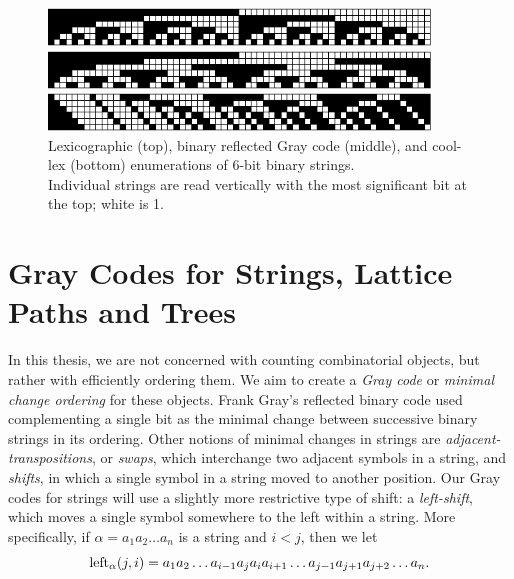 \begin{figure}
    \centering
\includegraphics[width=4in]{BLX6-cropped.pdf} 

\includegraphics[width=4in]{BRGC6-cropped.pdf} 

\includegraphics[width=4in]{BCLX6-cropped.pdf} 

    \caption{Lexicographic (top), binary reflected Gray code (middle), and cool-lex (bottom) enumerations of 6-bit binary strings. \\ 
    Individual strings are read vertically with the most significant bit at the top; white is 1.
    }
    \label{binary}
\end{figure}

\section{Gray Codes for Strings, Lattice Paths and Trees} \label{sec:intro_Graycodes}
In this thesis, we are not concerned with counting combinatorial objects, but rather with efficiently ordering them.  We aim to create a \emph{Gray code} or \emph{minimal change ordering} for these objects.  Frank Gray's reflected binary code used complementing a single bit as the minimal change between successive binary strings in its ordering.  Other notions of minimal changes in strings are \emph{adjacent-transpositions}, or \emph{swaps}, which interchange two adjacent symbols in a string, and \emph{shifts}, in which a single symbol in a string moved to another position. Our Gray codes for strings will use a slightly more restrictive type of shift: a \emph{left-shift}, which moves a single symbol somewhere to the left within a string. 
More specifically, if $\alpha = a_1 a_2 \ldots a_n$ is a string and $i < j$, then we let
\begin{equation}
    \lshiftindex[\alpha]{j}{i} = a_1 a_2 \ldots a_{i-1} a_j a_{i} a_{i+1} \ldots a_{j-1} a_{j+1} a_{j+2} \ldots a_n. \label{eq:leftdef}
\end{equation}


